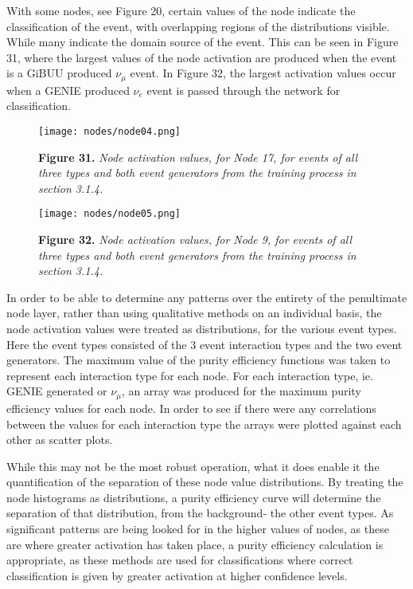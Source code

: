 \noindent With some nodes, see Figure 20, certain values of the node indicate the classification of the event, with overlapping regions of the distributions visible. While many indicate the domain source of the event. This can be seen in Figure 31, where the largest values of the node activation are produced when the event is a GiBUU produced $\nu_\mu$ event. In Figure 32, the largest activation values occur when a GENIE produced $\nu_e$ event is passed through the network for classification.\medskip

\begin{figure}[t!]
 \centering
 \texttt{[image: nodes/node04.png]}
 
 \textbf{Figure 31.} \textit{Node activation values, for Node 17, for events of all three types and both event generators from the training process in section 3.1.4.}

 \texttt{[image: nodes/node05.png]}
 
 \textbf{Figure 32.} \textit{Node activation values, for Node 9, for events of all three types and both event generators from the training process in section 3.1.4.}
\end{figure}

\noindent In order to be able to determine any patterns over the entirety of the penultimate node layer, rather than using qualitative methods on an individual basis, the node activation values were treated as distributions, for the various event types. Here the event types consisted of the 3 event interaction types and the two event generators. The maximum value of the purity efficiency functions was taken to represent each interaction type for each node. For each interaction type, ie. GENIE generated or $\nu_\mu$, an array was produced for the maximum purity efficiency values for each node. In order to see if there were any correlations between the values for each interaction type the arrays were plotted against each other as scatter plots.\medskip

\noindent While this may not be the most robust operation, what it does enable it the quantification of the separation of these node value distributions. By treating the node histograms as distributions, a purity efficiency curve will determine the separation of that distribution, from the background- the other event types. As significant patterns are being looked for in the higher values of nodes, as these are where greater activation has taken place, a purity efficiency calculation is appropriate, as these methods are used for classifications where correct classification is given by greater activation at higher confidence levels.\medskip

